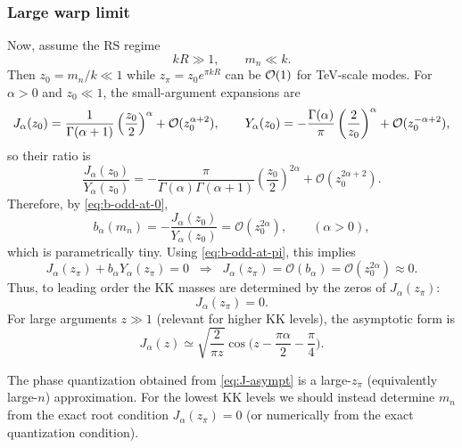\documentclass[11pt]{article}
\begin{document}
\subsubsection*{Large warp limit}
Now, assume the RS regime
\begin{equation}
kR\gg 1,\qquad m_n\ll k.
\label{eq:RS-regime}
\end{equation}
Then $z_0=m_n/k\ll 1$ while $z_\pi=z_0 e^{\pi kR}$ can be ${\cal O}(1)$ for TeV-scale modes.
For $\alpha>0$ and $z_0\ll 1$, the small-argument expansions are
\begin{equation}
J_\alpha(z_0)=\frac{1}{\Gamma(\alpha+1)}\left(\frac{z_0}{2}\right)^\alpha+{\cal O}(z_0^{\alpha+2}),
\qquad
Y_\alpha(z_0)=-\frac{\Gamma(\alpha)}{\pi}\left(\frac{2}{z_0}\right)^\alpha+{\cal O}(z_0^{-\alpha+2}),
\label{eq:small-z-bessels}
\end{equation}
so their ratio is
\begin{equation}
\frac{J_\alpha(z_0)}{Y_\alpha(z_0)}
=
-\frac{\pi}{\Gamma(\alpha)\Gamma(\alpha+1)}\left(\frac{z_0}{2}\right)^{2\alpha}
+\mathcal{O}\!\left(z_0^{2\alpha+2}\right).
\label{eq:ratio-small}
\end{equation}
Therefore, by \eqref{eq:b-odd-at-0},
\begin{equation}
b_\alpha(m_n)
=-\frac{J_\alpha(z_0)}{Y_\alpha(z_0)}
=\mathcal{O}\!\left(z_0^{2\alpha}\right),
\qquad (\alpha>0),
\label{eq:b-small-odd}
\end{equation}
which is parametrically tiny. Using \eqref{eq:b-odd-at-pi}, this implies
\begin{equation}
J_\alpha(z_\pi)+b_\alpha Y_\alpha(z_\pi)=0
\;\;\Longrightarrow\;\;
J_\alpha(z_\pi)=\mathcal{O}(b_\alpha)=\mathcal{O}(z_0^{2\alpha})\approx 0.
\label{eq:odd-root-leading}
\end{equation}
Thus, to leading order the KK masses are determined by the zeros of $J_\alpha(z_\pi)$:
\begin{equation}
J_\alpha(z_\pi)=0.
\label{eq:odd-zeros}
\end{equation}
For large arguments $z\gg 1$ (relevant for higher KK levels), the asymptotic form is
\begin{equation}
J_\alpha(z)\simeq \sqrt{\frac{2}{\pi z}}\cos\!\Big(z-\frac{\pi\alpha}{2}-\frac{\pi}{4}\Big).
\label{eq:J-asympt}
\end{equation}
\begin{notationbox}
  The phase quantization obtained from \eqref{eq:J-asympt} is a large-$z_\pi$ (equivalently large-$n$)
  approximation. For the lowest KK levels we should instead determine $m_n$ from the exact root
  condition $J_\alpha(z_\pi)=0$ (or numerically from the exact quantization condition).
\end{notationbox}
\end{document}
